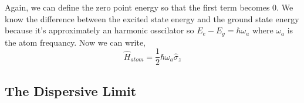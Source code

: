 \documentclass{article}
\numberwithin{equation}{section} %
\begin{document}
Again, we can define the zero point energy so that the first term becomes $0$. We know the difference between the excited state energy and the ground state energy because it's approximately an harmonic osscilator so $E_e - E_g = \hbar\omega_a$ where $\omega_a$ is the atom frequancy. Now we can write,
\begin{equation}
    \hat{H}_{atom} = \frac{1}{2}\hbar\omega_a\hat{\sigma}_z
\end{equation}

\subsection{The Dispersive Limit}
\end{document}
